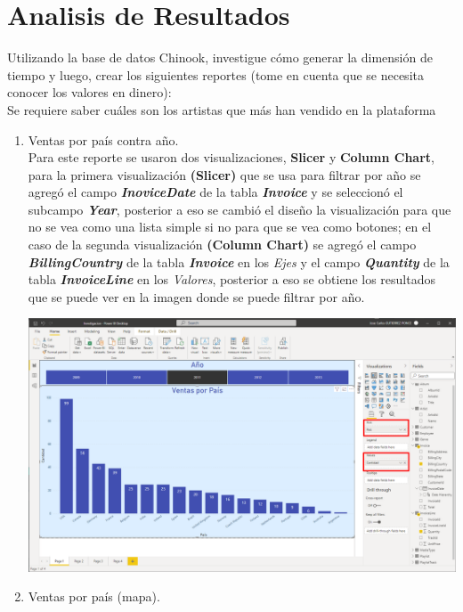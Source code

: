\documentclass{article}
\begin{document}
    \section{Analisis de Resultados}
    Utilizando la base de datos Chinook, investigue cómo generar la dimensión de tiempo y luego, crear los siguientes reportes (tome en cuenta que se necesita conocer los valores en dinero):\\[0.1in]
    Se requiere saber cuáles son los artistas que más han vendido en la plataforma
    \begin{enumerate}[\tab 1.]
        \item Ventas por país contra año.\\[0.1in]
        Para este reporte se usaron dos visualizaciones, \textbf{Slicer} y \textbf{Column Chart}, para la primera visualización \textbf{(Slicer)} que se usa para filtrar por año se agregó el campo \textit{\textbf{InoviceDate}} de la tabla \textit{\textbf{Invoice}} y se seleccionó el subcampo \textit{\textbf{Year}}, posterior a eso se cambió el diseño la visualización para que no se vea como una lista simple si no para que se vea como botones; en el caso de la segunda visualización \textbf{(Column Chart)} se agregó el campo \textit{\textbf{BillingCountry}} de la tabla \textit{\textbf{Invoice}} en los \textit{Ejes} y el campo \textit{\textbf{Quantity}} de la tabla \textit{\textbf{InvoiceLine}} en los \textit{Valores}, posterior a eso se obtiene los resultados que se puede ver en la imagen donde se puede filtrar por año.
        \begin{center}
            \includegraphics[width=13cm]{./images/20.png}
        \end{center}
        \newpage
        \item Ventas por país (mapa).\\[0.1in]

\end{enumerate}
\end{document}
